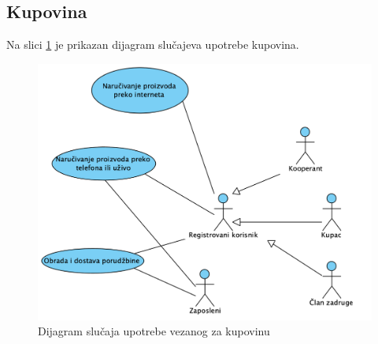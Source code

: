 \documentclass[a4paper, oneside]{article}
\begin{document}
\subsection{Kupovina}

Na slici %
\ref{dslucup_kupovina} je prikazan dijagram slučajeva upotrebe kupovina.

\begin{figure}[h!]
    \centering
    \includegraphics[scale=0.64]{images/dslucup_kupovina.png}
    \caption{Dijagram slučaja upotrebe vezanog za kupovinu}
    \label{dslucup_kupovina}
\end{figure}

\clearpage
\end{document}
